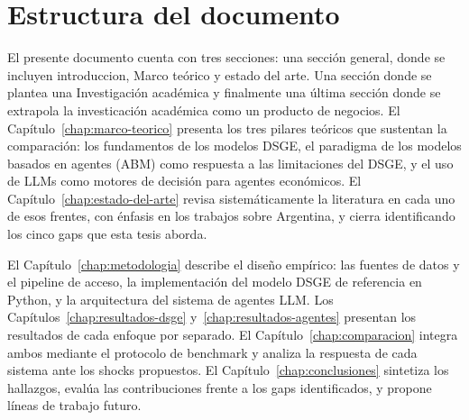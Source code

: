 \section{Estructura del documento}
\label{sec:estructura}
El presente documento cuenta con tres secciones: una sección general, donde se incluyen 
introduccion, Marco teórico y estado del arte. Una sección donde se plantea una Investigación
académica y finalmente una última sección donde se extrapola la investicación académica como un 
producto de negocios.
El Capítulo~\ref{chap:marco-teorico} presenta los tres pilares teóricos que sustentan la
comparación: los fundamentos de los modelos DSGE, el paradigma de los modelos basados en
agentes (ABM) como respuesta a las limitaciones del DSGE, y el uso de LLMs como motores
de decisión para agentes económicos. El Capítulo~\ref{chap:estado-del-arte} revisa
sistemáticamente la literatura en cada uno de esos frentes, con énfasis en los trabajos
sobre Argentina, y cierra identificando los cinco gaps que esta tesis aborda.

El Capítulo~\ref{chap:metodologia} describe el diseño empírico: las fuentes de datos y
el pipeline de acceso, la implementación del modelo DSGE de referencia en Python, y la
arquitectura del sistema de agentes LLM. Los Capítulos~\ref{chap:resultados-dsge}
y~\ref{chap:resultados-agentes} presentan los resultados de cada enfoque por separado.
El Capítulo~\ref{chap:comparacion} integra ambos mediante el protocolo de benchmark y
analiza la respuesta de cada sistema ante los shocks propuestos. El
Capítulo~\ref{chap:conclusiones} sintetiza los hallazgos, evalúa las contribuciones
frente a los gaps identificados, y propone líneas de trabajo futuro.
